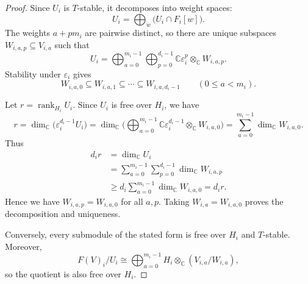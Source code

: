 \documentclass[12pt,reqno]{amsart}
\numberwithin{equation}{section}
\theoremstyle{definition}
\theoremstyle{remark}
\newcommand{\rank}{\operatorname{rank}}
\theoremstyle{plain}
\theoremstyle{plain}
\begin{document}
\begin{proof}
Since $U_i$ is $T$-stable, it decomposes into weight spaces:
\[
    U_i=\bigoplus_w\bigl(U_i\cap F_i[w]\bigr).
\]
The weights $a+pm_i$ are pairwise distinct, so there are unique subspaces
$W_{i,a,p}\subseteq V_{i,a}$ such that
\[
    U_i=
    \bigoplus_{a=0}^{m_i-1}
    \bigoplus_{p=0}^{d_i-1}
    \mathbb C\varepsilon_i^p
    \otimes_{\mathbb C}W_{i,a,p}.
\]
Stability under $\varepsilon_i$ gives
\[
    W_{i,a,0}\subseteq W_{i,a,1}
    \subseteq\cdots\subseteq W_{i,a,d_i-1}
    \qquad(0\le a<m_i).
\]

Let $r=\rank_{H_i}U_i$. Since $U_i$ is free over $H_i$, we have
\[
    r=\dim_{\mathbb C}
    \bigl(\varepsilon_i^{d_i-1}U_i\bigr)=\dim_{\mathbb C}\bigl( \bigoplus_{a=0}^{m_i-1}
    \mathbb C\varepsilon_i^{d_i-1}
    \otimes_{\mathbb C}W_{i,a,0} \bigr)=\sum_{a=0}^{m_i-1}
    \dim_{\mathbb C}W_{i,a,0}.
\]
Thus
\[
\begin{aligned}
    d_i r
    &=\dim_{\mathbb C}U_i\\
    &=\sum_{a=0}^{m_i-1}
      \sum_{p=0}^{d_i-1}
      \dim_{\mathbb C}W_{i,a,p}\\
    &\ge
      d_i\sum_{a=0}^{m_i-1}
      \dim_{\mathbb C}W_{i,a,0}
      =d_i r.
\end{aligned}
\]
Hence we have $W_{i,a,p}=W_{i,a,0}$ for all $a,p$. Taking $W_{i,a}=W_{i,a,0}$ proves the decomposition and uniqueness.

Conversely, every submodule of the stated form is free over $H_i$ and $T$-stable. Moreover,
\[
    F(V)_i/U_i
    \cong
    \bigoplus_{a=0}^{m_i-1}
    H_i\otimes_{\mathbb C}(V_{i,a}/W_{i,a}),
\]
so the quotient is also free over $H_i$.
\end{proof}
\end{document}
